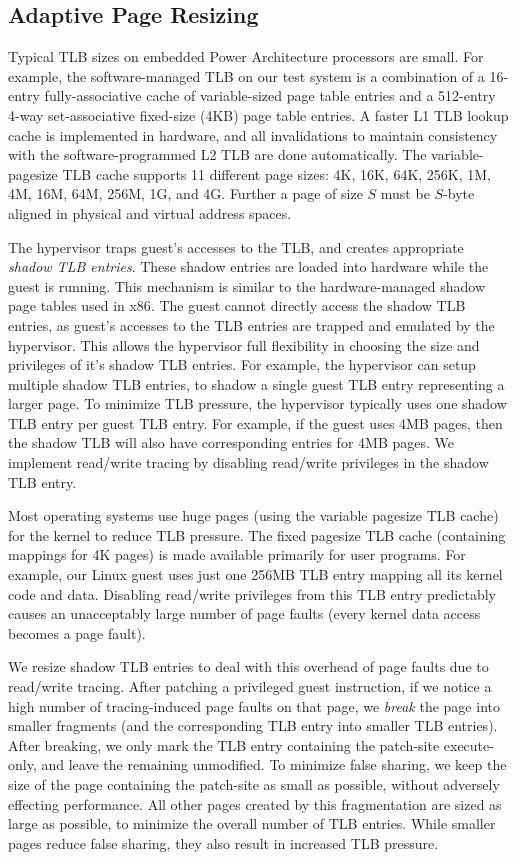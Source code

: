\documentclass[10pt,twocolumn]{article}
\begin{document}
\subsection{Adaptive Page Resizing}
Typical TLB sizes on embedded Power Architecture processors are small.
For example, the software-managed TLB on our test system is a combination of a 16-entry
fully-associative cache of variable-sized page table entries
and a 512-entry 4-way set-associative fixed-size (4KB) page table entries.
A faster L1 TLB lookup cache is implemented in hardware, and all invalidations
to maintain consistency with the software-programmed L2 TLB are done automatically.
The variable-pagesize TLB cache supports 11 different page sizes: 4K, 16K, 64K,
256K, 1M, 4M, 16M, 64M, 256M, 1G, and 4G. Further a page of size $S$ must be $S$-byte
aligned in physical and virtual address spaces.

The hypervisor traps guest's accesses to the TLB, and creates appropriate
{\em shadow TLB entries}. These shadow entries are loaded into hardware
while the guest is
running. This mechanism is similar to the hardware-managed shadow page
tables used in x86\cite{adams:asplos06}. The guest cannot directly access the shadow
TLB entries, as guest's accesses to the TLB entries are trapped and emulated by
the hypervisor. This allows the hypervisor full flexibility in choosing the
size and privileges of it's shadow TLB entries. For example, the hypervisor
can setup multiple shadow TLB entries, to shadow a single guest TLB entry representing
a larger page.
To minimize TLB pressure, the hypervisor typically uses
one shadow TLB entry per guest TLB entry. For example, if the guest uses 4MB pages,
then the shadow TLB will also have corresponding entries for 4MB pages. We
implement read/write tracing by disabling read/write privileges in the shadow TLB entry.

Most operating systems use huge pages (using the variable pagesize TLB cache)
for the kernel to
reduce TLB pressure. The fixed pagesize TLB cache (containing mappings for 4K pages) is
made available primarily for user programs. For example, our Linux guest
uses just one 256MB TLB entry mapping all its kernel code and data.
Disabling read/write privileges from this TLB entry predictably causes an unacceptably
large number of page faults (every kernel data access becomes a page fault).

We resize shadow TLB entries to deal with this overhead of page faults due to read/write
tracing. After patching a privileged guest instruction, if we notice
a high number of tracing-induced page faults on that page, we {\em break} the page into
smaller fragments (and the corresponding TLB entry into smaller TLB entries).
After breaking,
we only mark the
TLB entry containing the patch-site execute-only, and leave the remaining
unmodified.
To minimize false sharing, we keep the
size of the page containing the patch-site as small as possible, without
adversely effecting performance. All other pages created by this fragmentation
are sized
as large as possible, to minimize
the overall number of TLB entries. While smaller pages reduce false sharing, they
also result in increased TLB pressure.
\end{document}

